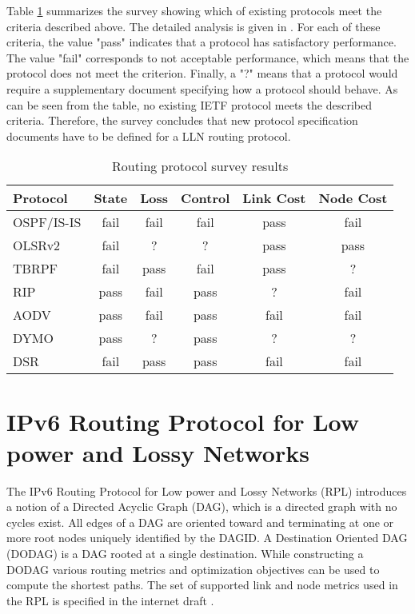 Table \ref{table:routing.prot.survey} summarizes the survey showing which of existing protocols meet the criteria described above. The detailed analysis is given in \cite{draft-protocols-07}. For each of these criteria, the value "pass" indicates that a protocol has satisfactory performance.  The value "fail" corresponds to not acceptable performance, which means that the protocol does not meet the criterion. Finally, a "?" means that a protocol would require a supplementary document specifying how a protocol should behave. As can be seen from the table, no existing IETF protocol meets the described criteria. Therefore, the survey concludes that new protocol specification documents have to be defined for a LLN routing protocol.


\begin{table}[htp]
\begin{center}
        \begin{tabular}{|l|c|c|c|c|c|}
          \hline
          Protocol   &   State &  Loss & Control &  Link Cost & Node Cost\\
          \hline
          \hline
     OSPF/IS-IS  &  fail  &  fail  &  fail   &   pass    &   fail\\
     OLSRv2      &  fail  &   ?    &   ?     &   pass    &   pass\\
     TBRPF       &  fail  &  pass  &  fail   &   pass    &    ?\\
     RIP         &  pass  &  fail  &  pass   &    ?      &   fail\\
     AODV        &  pass  &  fail  &  pass   &   fail    &   fail\\
     DYMO        &  pass  &   ?    &  pass   &    ?      &    ?\\
     DSR         &  fail  &  pass  &  pass   &   fail    &   fail\\
          \hline
        \end{tabular}
\end{center}
\caption{Routing protocol survey results}\label{table:routing.prot.survey}
\end{table}


\section{IPv6 Routing Protocol for Low power and Lossy Networks}\label{sec:rout.rpl}
The IPv6 Routing Protocol for Low power and Lossy Networks (RPL) introduces a notion of a Directed Acyclic Graph (DAG), which is a directed graph with no cycles exist. All edges of a DAG are oriented toward and terminating at one or more root nodes uniquely identified by the DAGID. A Destination Oriented DAG (DODAG) is a DAG rooted at a single destination. While constructing a DODAG various routing metrics and optimization objectives can be used to compute the shortest paths. The set of supported link and node metrics used in the RPL is specified in the internet draft \cite{draft-routing-metrics-04}. 

